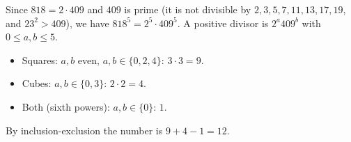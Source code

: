 Since $818=2\cdot409$ and $409$ is prime (it is not divisible by $2,3,5,7,11,13,17,19$, and $23^2>409$), we have $818^5=2^5\cdot409^5$. A positive divisor is $2^a409^b$ with $0\le a,b\le5$.
\begin{itemize}
\item Squares: $a,b$ even, $a,b\in\{0,2,4\}$: $3\cdot3=9$.
\item Cubes: $a,b\in\{0,3\}$: $2\cdot2=4$.
\item Both (sixth powers): $a,b\in\{0\}$: $1$.
\end{itemize}
By inclusion-exclusion the number is $9+4-1=\boxed{12}$.
